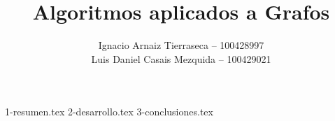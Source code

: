 \documentclass[es]{uc3mreport}
\author{
  Ignacio Arnaiz Tierraseca -- 100428997\\
  Luis Daniel Casais Mezquida -- 100429021
}
\title{Algoritmos aplicados a Grafos}
\begin{document}
  \makecover[old]

  \tableofcontents
  \listoffigures
  \listoftables

  \begin{report}
    {1-resumen.tex}
    {2-desarrollo.tex}
    {3-conclusiones.tex}
  \end{report}


  \begin{appendices}
  \end{appendices}
\end{document}
